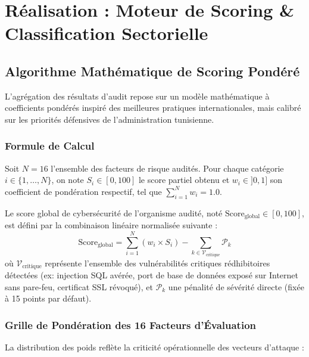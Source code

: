 \chapter[Scoring \& Classification Sectorielle]{Réalisation : Moteur de Scoring \& Classification Sectorielle}
\label{chap:scoring}

\section{Algorithme Mathématique de Scoring Pondéré}
L'agrégation des résultats d'audit repose sur un modèle mathématique à coefficients pondérés inspiré des meilleures pratiques internationales, mais calibré sur les priorités défensives de l'administration tunisienne.

\subsection{Formule de Calcul}
Soit $N = 16$ l'ensemble des facteurs de risque audités. Pour chaque catégorie $i \in \{1, \dots, N\}$, on note $S_i \in [0, 100]$ le score partiel obtenu et $w_i \in ]0, 1]$ son coefficient de pondération respectif, tel que $\sum_{i=1}^{N} w_i = 1.0$.

Le score global de cybersécurité de l'organisme audité, noté $\text{Score}_{\text{global}} \in [0, 100]$, est défini par la combinaison linéaire normalisée suivante :
\begin{equation}
\text{Score}_{\text{global}} = \sum_{i=1}^{N} \left( w_i \times S_i \right) - \sum_{k \in \mathcal{V}_{\text{critique}}} \mathcal{P}_k
\end{equation}
où $\mathcal{V}_{\text{critique}}$ représente l'ensemble des vulnérabilités critiques rédhibitoires détectées (ex: injection SQL avérée, port de base de données exposé sur Internet sans pare-feu, certificat SSL révoqué), et $\mathcal{P}_k$ une pénalité de sévérité directe (fixée à 15 points par défaut).

\subsection{Grille de Pondération des 16 Facteurs d'Évaluation}
La distribution des poids reflète la criticité opérationnelle des vecteurs d'attaque :

